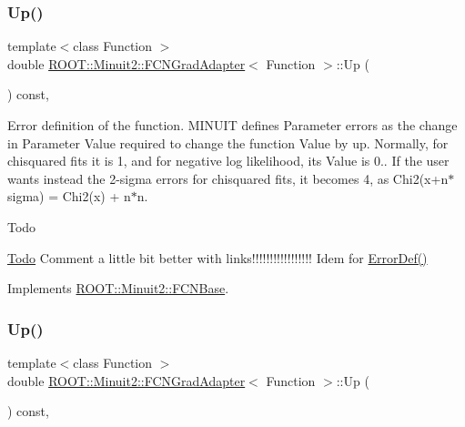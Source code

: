 \subsubsection{\texorpdfstring{Up()}{Up()}\hspace{0.1cm}{\footnotesize\ttfamily [1/3]}}
{\footnotesize\ttfamily template$<$class Function $>$ \\
double \mbox{\hyperlink{classROOT_1_1Minuit2_1_1FCNGradAdapter}{R\+O\+O\+T\+::\+Minuit2\+::\+F\+C\+N\+Grad\+Adapter}}$<$ Function $>$\+::Up (\begin{DoxyParamCaption}{ }\end{DoxyParamCaption}) const\hspace{0.3cm}{\ttfamily [inline]}, {\ttfamily [virtual]}}

Error definition of the function. M\+I\+N\+U\+IT defines Parameter errors as the change in Parameter Value required to change the function Value by up. Normally, for chisquared fits it is 1, and for negative log likelihood, its Value is 0.. If the user wants instead the 2-\/sigma errors for chisquared fits, it becomes 4, as Chi2(x+n$\ast$sigma) = Chi2(x) + n$\ast$n.

\begin{DoxyRefDesc}{Todo}
\item[\mbox{\hyperlink{todo__todo000001}{Todo}}]Comment a little bit better with links!!!!!!!!!!!!!!!!! Idem for \mbox{\hyperlink{classROOT_1_1Minuit2_1_1FCNBase_ac4592475c58a65b037ba97ab5f3cba10}{Error\+Def()}}\end{DoxyRefDesc}


Implements \mbox{\hyperlink{classROOT_1_1Minuit2_1_1FCNBase_a04ef08ddad92ce8d89d498efbe021c39}{R\+O\+O\+T\+::\+Minuit2\+::\+F\+C\+N\+Base}}.

\mbox{\label{classROOT_1_1Minuit2_1_1FCNGradAdapter_a99e41f07b3f7374c0b17ef42f1c15a19}} 
\subsubsection{\texorpdfstring{Up()}{Up()}\hspace{0.1cm}{\footnotesize\ttfamily [2/3]}}
{\footnotesize\ttfamily template$<$class Function $>$ \\
double \mbox{\hyperlink{classROOT_1_1Minuit2_1_1FCNGradAdapter}{R\+O\+O\+T\+::\+Minuit2\+::\+F\+C\+N\+Grad\+Adapter}}$<$ Function $>$\+::Up (\begin{DoxyParamCaption}{ }\end{DoxyParamCaption}) const\hspace{0.3cm}{\ttfamily [inline]}, {\ttfamily [virtual]}}

